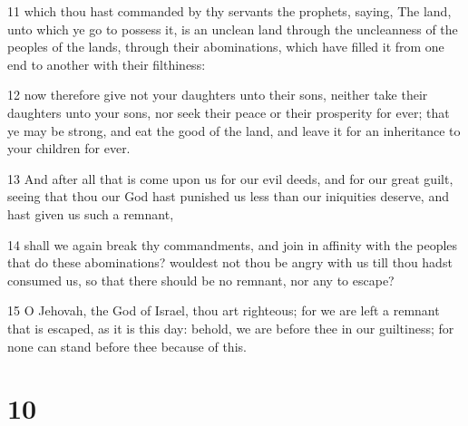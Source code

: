 \par 11 which thou hast commanded by thy servants the prophets, saying, The land, unto which ye go to possess it, is an unclean land through the uncleanness of the peoples of the lands, through their abominations, which have filled it from one end to another with their filthiness:
\par 12 now therefore give not your daughters unto their sons, neither take their daughters unto your sons, nor seek their peace or their prosperity for ever; that ye may be strong, and eat the good of the land, and leave it for an inheritance to your children for ever.
\par 13 And after all that is come upon us for our evil deeds, and for our great guilt, seeing that thou our God hast punished us less than our iniquities deserve, and hast given us such a remnant,
\par 14 shall we again break thy commandments, and join in affinity with the peoples that do these abominations? wouldest not thou be angry with us till thou hadst consumed us, so that there should be no remnant, nor any to escape?
\par 15 O Jehovah, the God of Israel, thou art righteous; for we are left a remnant that is escaped, as it is this day: behold, we are before thee in our guiltiness; for none can stand before thee because of this.

\chapter{10}

